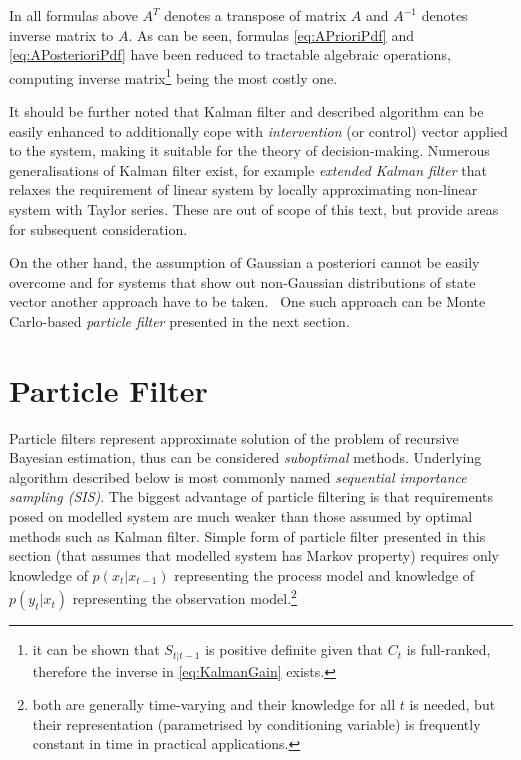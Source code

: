 In all formulas above \(A^T\) denotes a transpose of matrix \(A\) and \(A^{-1}\) denotes inverse
matrix to \(A\). As can be seen, formulas \eqref{eq:APrioriPdf} and \eqref{eq:APosterioriPdf} have
been reduced to tractable algebraic operations, computing inverse matrix\footnote{it can be shown
that \(S_{t|t-1}\) is positive definite given that \(C_t\) is full-ranked,
therefore the inverse in \eqref{eq:KalmanGain} exists.} being the most costly one.

It should be further noted that Kalman filter and described algorithm can be easily enhanced to
additionally cope with \emph{intervention} (or control) vector applied to the system, making it
suitable for the theory of decision-making. Numerous generalisations of Kalman filter exist, for
example \emph{extended Kalman filter} that relaxes the requirement of linear system by locally
approximating non-linear system with Taylor series. These are out of scope of this
text, but provide areas for subsequent consideration.

On the other hand, the assumption of Gaussian a posteriori {\pdf} cannot be easily overcome and for
systems that show out non-Gaussian distributions of state vector another approach have to be
taken.~\cite{AruMasGor:02} One such approach can be Monte Carlo-based \emph{particle filter}
presented in the next section.

\section{Particle Filter} \label{sec:ParticleFilter}

Particle filters represent approximate solution of the problem of recursive Bayesian estimation,
thus can be considered \emph{suboptimal} methods. Underlying algorithm described below is most
commonly named \emph{sequential importance sampling (SIS)}. The biggest advantage of particle filtering
is that requirements posed on modelled system are much weaker than those assumed by optimal methods
such as Kalman filter. Simple form of particle filter presented in this section (that assumes that
modelled system has Markov property) requires only knowledge of {\pdf} \(p(x_t|x_{t-1})\)
representing the process model and knowledge of \(p(y_t|x_t)\) representing the observation
model.\footnote{both {\pdfs} are generally time-varying and their knowledge for all \(t\) is needed,
but their representation (parametrised by conditioning variable) is frequently constant in time in
practical applications.}

